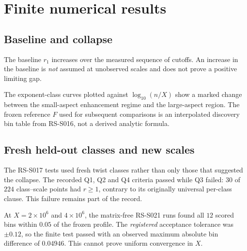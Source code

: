 \section{Finite numerical results}\label{sec:results}
\subsection{Baseline and collapse}
The baseline \(r_1\) increases over the measured sequence of cutoffs.
An increase in the baseline is \emph{not} assumed at unobserved
scales and does not prove a positive limiting gap.

The exponent-class curves plotted against \(\log_{10}(n/X)\)
show a marked change between the small-aspect enhancement
regime and the large-aspect region. The frozen reference
\(F\) used for subsequent comparisons is an interpolated
discovery bin table from RS-S016, not a derived analytic formula.

\subsection{Fresh held-out classes and new scales}
The RS-S017 tests used fresh twist classes rather than only those
that suggested the collapse. The recorded Q1, Q2 and Q4 criteria
passed while Q3 failed: \(30\) of \(224\) class--scale points
had \(r\ge1\), contrary to its originally universal
per-class clause. This failure remains part of the record.

At \(X=2\times10^6\) and \(4\times10^6\), the
matrix-free RS-S021 runs found all \(12\) scored bins within \(0.05\) of the frozen
profile. The \emph{registered} acceptance tolerance was
\(\pm0.12\), so the finite test passed with an observed
maximum absolute bin difference of \(0.04946\).
This cannot prove uniform convergence in \(X\).

